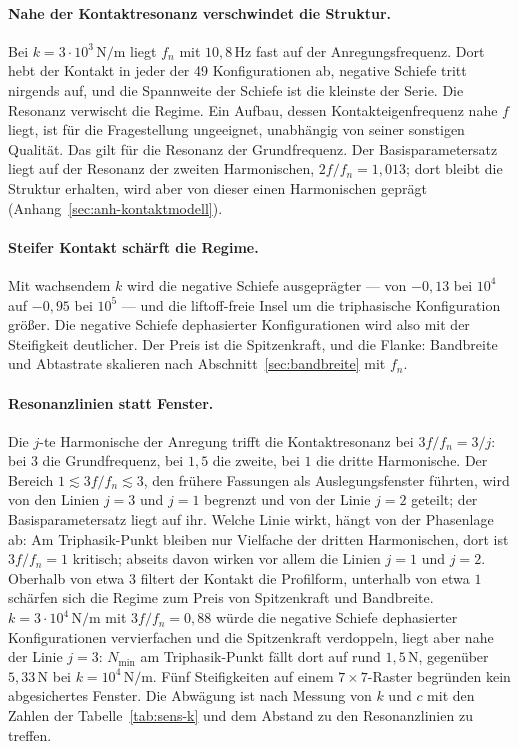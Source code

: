 \documentclass[12pt,a4paper]{report}
\begin{document}
\paragraph{Nahe der Kontaktresonanz verschwindet die Struktur.}
Bei $k = 3\cdot10^{3}\,\mathrm{N/m}$ liegt $f_n$ mit $10{,}8\,\mathrm{Hz}$
fast auf der Anregungsfrequenz. Dort hebt der Kontakt in jeder der 49
Konfigurationen ab, negative Schiefe tritt nirgends auf, und die
Spannweite der Schiefe ist die kleinste der Serie. Die Resonanz
verwischt die Regime. Ein Aufbau, dessen Kontakteigenfrequenz nahe $f$
liegt, ist für die Fragestellung ungeeignet, unabhängig von seiner
sonstigen Qualität. Das gilt für die Resonanz der Grundfrequenz. Der
Basisparametersatz liegt auf der Resonanz der zweiten Harmonischen,
$2f/f_n = 1{,}013$; dort bleibt die Struktur erhalten, wird aber von
dieser einen Harmonischen geprägt (Anhang~\ref{sec:anh-kontaktmodell}).

\paragraph{Steifer Kontakt schärft die Regime.}
Mit wachsendem $k$ wird die negative Schiefe ausgeprägter --- von
$-0{,}13$ bei $10^{4}$ auf $-0{,}95$ bei $10^{5}$ --- und die
liftoff-freie Insel um die triphasische Konfiguration größer. Die
negative Schiefe dephasierter Konfigurationen wird also mit der
Steifigkeit deutlicher. Der Preis ist die Spitzenkraft, und die Flanke: Bandbreite
und Abtastrate skalieren nach Abschnitt~\ref{sec:bandbreite} mit $f_n$.

\paragraph{Resonanzlinien statt Fenster.}
Die $j$-te Harmonische der Anregung trifft die Kontaktresonanz bei
$3f/f_n = 3/j$: bei $3$ die Grundfrequenz, bei $1{,}5$ die zweite, bei
$1$ die dritte Harmonische. Der Bereich $1 \lesssim 3f/f_n \lesssim 3$,
den frühere Fassungen als Auslegungsfenster führten, wird von den Linien
$j = 3$ und $j = 1$ begrenzt und von der Linie $j = 2$ geteilt; der
Basisparametersatz liegt auf ihr. Welche Linie wirkt, hängt von der
Phasenlage ab: Am Triphasik-Punkt bleiben nur Vielfache der dritten
Harmonischen, dort ist $3f/f_n = 1$ kritisch; abseits davon wirken vor
allem die Linien $j = 1$ und $j = 2$. Oberhalb von etwa $3$ filtert der
Kontakt die Profilform, unterhalb von etwa $1$ schärfen sich die Regime
zum Preis von Spitzenkraft und Bandbreite.
$k = 3\cdot10^{4}\,\mathrm{N/m}$ mit $3f/f_n = 0{,}88$ würde die negative
Schiefe dephasierter Konfigurationen vervierfachen und die Spitzenkraft
verdoppeln, liegt aber nahe der Linie $j = 3$: $N_{\min}$ am
Triphasik-Punkt fällt dort auf rund $1{,}5\,\mathrm{N}$, gegenüber
$5{,}33\,\mathrm{N}$ bei $k = 10^{4}\,\mathrm{N/m}$. Fünf Steifigkeiten
auf einem $7\times7$-Raster begründen kein abgesichertes Fenster. Die
Abwägung ist nach Messung von $k$ und $c$ mit den Zahlen der
Tabelle~\ref{tab:sens-k} und dem Abstand zu den Resonanzlinien zu
treffen.
\end{document}
